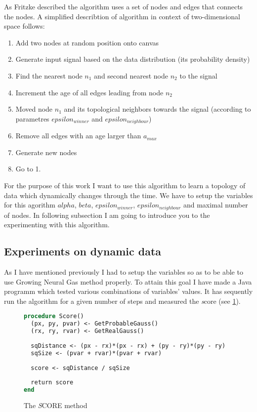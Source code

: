 As Fritzke described the algorithm uses a set of nodes and edges that connects the nodes. A simplified describtion of algorithm in context of two-dimensional space follows:

\begin{enumerate}
\item Add two nodes at random position onto canvas
\item Generate input signal based on the data distribution (its probability density)
\item Find the nearest node $n_1$ and second nearest node $n_2$ to the signal
\item Increment the age of all edges leading from node $n_2$
\item Moved node $n_1$ and its topological neighbors towards the signal (according to parametres $epsilon_{winner}$ and $epsilon_{neighbour}$)
\item Remove all edges with an age larger than $a_{max}$
\item Generate new nodes
\item Go to 1.
\end{enumerate}

For the purpose of this work I want to use this algorithm to learn a topology of data which dynamically changes through the time. We have to setup the variables for this agorithm $alpha$, $beta$, $epsilon_{winner}$, $epsilon_{neighbour}$ and maximal number of nodes. In following subsection I am going to introduce you to the experimenting with this algorithm.

\subsection{Experiments on dynamic data}

As I have mentioned previously I had to setup the variables so as to be able to use Growing Neural Gas method properly. To attain this goal I have made a Java programm which tested various combinations of variables' values. It has sequently run the algorithm for a given number of steps and measured the {\emph score} (see \ref{usedalgo:scoremethod}).

\begin{figure}
\caption{The {\emph SCORE} method}
\begin{lstlisting}[language=Pascal]
procedure Score()
  (px, py, pvar) <- GetProbableGauss()
  (rx, ry, rvar) <- GetRealGauss()
  
  sqDistance <- (px - rx)*(px - rx) + (py - ry)*(py - ry)
  sqSize <- (pvar + rvar)*(pvar + rvar)
  
  score <- sqDistance / sqSize
  
  return score
end
\end{lstlisting}    
\label{usedalgo:scoremethod}
\end{figure}

